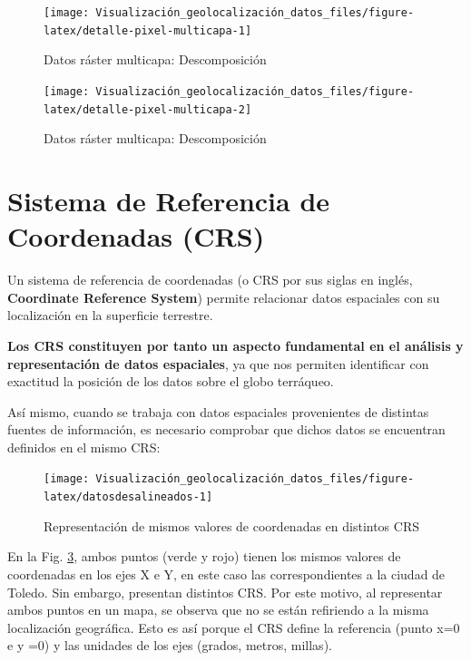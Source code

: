 \documentclass[
]{report}
\theoremstyle{definition}
\theoremstyle{definition}
\theoremstyle{definition}
\theoremstyle{definition}
\theoremstyle{remark}
\begin{document}
\begin{figure}

{\centering \texttt{[image: Visualización\_geolocalización\_datos\_files/figure-latex/detalle-pixel-multicapa-1]} 

}

\caption{Datos ráster multicapa: Descomposición}\label{fig:detalle-pixel-multicapa-1}
\end{figure}
\begin{figure}

{\centering \texttt{[image: Visualización\_geolocalización\_datos\_files/figure-latex/detalle-pixel-multicapa-2]} 

}

\caption{Datos ráster multicapa: Descomposición}\label{fig:detalle-pixel-multicapa-2}
\end{figure}

\hypertarget{CRS}{%
\section{Sistema de Referencia de Coordenadas (CRS)}\label{CRS}}

Un sistema de referencia de coordenadas (o CRS por sus siglas en inglés,
\textbf{Coordinate Reference System}) permite relacionar datos espaciales con su
localización en la superficie terrestre.

\textbf{Los CRS constituyen por tanto un aspecto fundamental en el análisis y
representación de datos espaciales}, ya que nos permiten identificar con
exactitud la posición de los datos sobre el globo terráqueo.

Así mismo, cuando se trabaja con datos espaciales provenientes de distintas
fuentes de información, es necesario comprobar que dichos datos se encuentran
definidos en el mismo CRS:

\begin{figure}

{\centering \texttt{[image: Visualización\_geolocalización\_datos\_files/figure-latex/datosdesalineados-1]} 

}

\caption{Representación de mismos valores de coordenadas en distintos CRS}\label{fig:datosdesalineados}
\end{figure}

En la Fig. \ref{fig:datosdesalineados}, ambos puntos (verde y rojo) tienen los
mismos valores de coordenadas en los ejes X e Y, en este caso las
correspondientes a la ciudad de Toledo. Sin embargo, presentan distintos CRS.
Por este motivo, al representar ambos puntos en un mapa, se observa que no se
están refiriendo a la misma localización geográfica. Esto es así porque el CRS
define la referencia (punto x=0 e y =0) y las unidades de los ejes (grados,
metros, millas).
\end{document}
